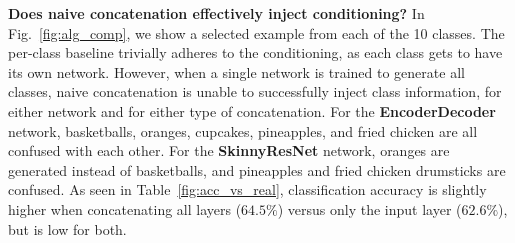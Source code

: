


\vspace{2mm} \noindent \textbf{Does naive concatenation effectively inject conditioning?} In Fig.~\ref{fig:alg_comp}, we show a selected example from each of the 10 classes. The per-class baseline trivially adheres to the conditioning, as each class gets to have its own network. However, when a single network is trained to generate all classes, naive concatenation is unable to successfully inject class information, for either network and for either type of concatenation. For the \textbf{EncoderDecoder} network, basketballs, oranges, cupcakes, pineapples, and fried chicken are all confused with each other. For the \textbf{SkinnyResNet} network, oranges are generated instead of basketballs, and pineapples and fried chicken drumsticks are confused. As seen in Table~\ref{fig:acc_vs_real}, classification accuracy is slightly higher when concatenating all layers ($64.5\%$) versus only the input layer ($62.6\%$), but is low for both.

